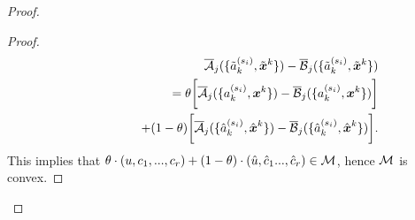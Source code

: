 \documentclass[journal]{IEEEtran}
\newcommand{\bv}[1]{{\boldsymbol{#1} }}
\newcommand{\script}[1]{{{\cal{#1} }}}
\begin{document}
\begin{proof}
\begin{proof}
\begin{eqnarray*}
\hspace{-.3in}&&\overline{\script{A}}_j(\{\tilde{a}^{(s_i)}_k, \tilde{\bv{x}}^k\})- \overline{\script{B}}_j(\{\tilde{a}^{(s_i)}_k, \tilde{\bv{x}}^k\})\\
\hspace{-.3in}&&\qquad\qquad\quad=\theta\bigg[\overline{\script{A}}_j(\{a^{(s_i)}_k, \bv{x}^k\})- \overline{\script{B}}_j(\{a^{(s_i)}_k, \bv{x}^k\})\bigg] \\
\hspace{-.3in}&&\qquad\qquad\qquad+(1-\theta)\bigg[\overline{\script{A}}_j(\{\hat{a}^{(s_i)}_k, \hat{\bv{x}}^k\})- \overline{\script{B}}_j(\{\hat{a}^{(s_i)}_k, \hat{\bv{x}}^k\})\bigg].
\end{eqnarray*}
This implies that $\theta\cdot(u, c_1, ..., c_r)+(1-\theta)\cdot (\hat{u}, \hat{c}_1 ..., \hat{c}_r)\in\script{M}$, hence $\script{M}$ is convex. 


\end{proof}
\end{proof}
\end{document}
